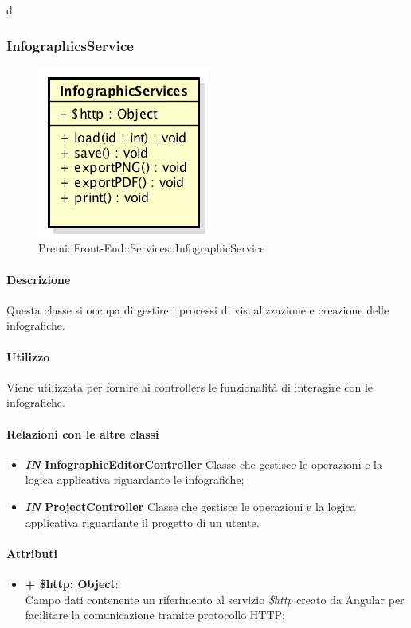 	d
\subsubsection{InfographicsService}
	\begin{figure}[h]
		\centering
		\includegraphics[width=0.4\linewidth]{img/premi_front_end_services_infographicservice}
		\caption[Premi::Front-End::Services::InfographicService]{Premi::Front-End::Services::InfographicService}
	\end{figure}
	
	\paragraph{Descrizione}
	Questa classe si occupa di gestire i processi di visualizzazione e creazione delle infografiche.
	
	\paragraph{Utilizzo}
	Viene utilizzata per fornire ai controllers le funzionalità di interagire con le infografiche.
	
	\paragraph{Relazioni con le altre classi}
	\begin{itemize}
		\item \textbf{\textit{IN} InfographicEditorController}
		Classe che gestisce le operazioni e la logica applicativa riguardante le infografiche;
		\item \textbf{\textit{IN} ProjectController}
		Classe che gestisce le operazioni e la logica applicativa riguardante il progetto di un utente.
	\end{itemize}
	
	\paragraph{Attributi}
	\begin{itemize}
		\item \textbf{+ \$http: Object}:\\
		Campo dati contenente un riferimento al servizio \textit{\$http} creato da Angular per facilitare la comunicazione tramite protocollo HTTP;
	\end{itemize}
	
